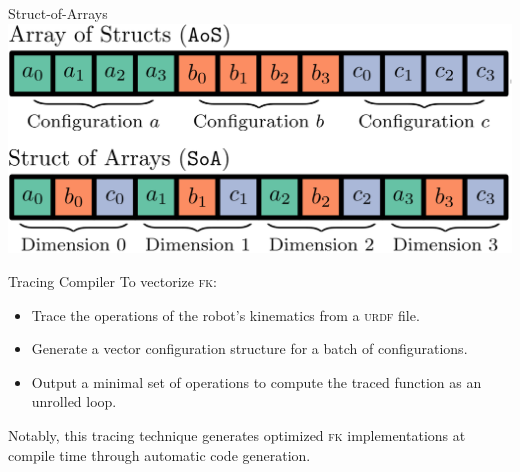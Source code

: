 \documentclass{beamer}
\begin{document}
\begin{frame}{Struct-of-Arrays}
\centering
\includegraphics[width=\textwidth]{./assets/soa_aos.png}
\end{frame}

\begin{frame}{Tracing Compiler}
To vectorize \textsc{fk}:
\begin{itemize}
\item Trace the operations of the robot's kinematics from a \textsc{urdf} file.
\item Generate a vector configuration structure for a batch of configurations. 
\item Output a minimal set of operations to compute the traced function as an unrolled loop.
\end{itemize}

Notably, this tracing technique generates optimized \textsc{fk} implementations at compile time through automatic code generation.
\end{frame}
\end{document}
